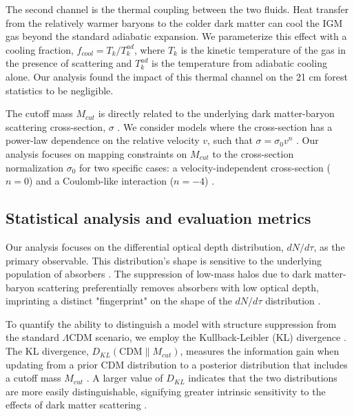 \documentclass[]{article}
\begin{document}
The second channel is the thermal coupling between the two fluids. Heat transfer from the relatively warmer baryons to the colder dark matter can cool the IGM gas beyond the standard adiabatic expansion. \citep{Mu_oz_2017,short2022darkmatterbaryonscatteringeffects} We parameterize this effect with a cooling fraction, $f_{cool} = T_k / T_k^{ad}$, where $T_k$ is the kinetic temperature of the gas in the presence of scattering and $T_k^{ad}$ is the temperature from adiabatic cooling alone. Our analysis found the impact of this thermal channel on the 21 cm forest statistics to be negligible.

The cutoff mass $M_{cut}$ is directly related to the underlying dark matter-baryon scattering cross-section, $\sigma$ . We consider models where the cross-section has a power-law dependence on the relative velocity $v$, such that $\sigma = \sigma_0 v^n$ \citep{Mahdawi_2018,Rahimieh_2025}. Our analysis focuses on mapping constraints on $M_{cut}$ to the cross-section normalization $\sigma_0$ for two specific cases: a velocity-independent cross-section ($n=0$) and a Coulomb-like interaction ($n=-4$) \citep{Mahdawi_2018,Rahimieh_2025}.

\subsection{Statistical analysis and evaluation metrics}

Our analysis focuses on the differential optical depth distribution, $dN/d\tau$, as the primary observable. This distribution's shape is sensitive to the underlying population of absorbers \citep{filipp2026lsststronglensingsystems}. The suppression of low-mass halos due to dark matter-baryon scattering preferentially removes absorbers with low optical depth, imprinting a distinct "fingerprint" on the shape of the $dN/d\tau$ distribution .

To quantify the ability to distinguish a model with structure suppression from the standard $\Lambda$CDM scenario, we employ the Kullback-Leibler (KL) divergence \citep{Hee_2016,herrera2026informationtheoreticastrophysicaluncertaintieseffective}. The KL divergence, $D_{KL}(\text{CDM} \parallel M_{cut})$, measures the information gain when updating from a prior CDM distribution to a posterior distribution that includes a cutoff mass $M_{cut}$ \citep{Hee_2016,herrera2026informationtheoreticastrophysicaluncertaintieseffective}. A larger value of $D_{KL}$ indicates that the two distributions are more easily distinguishable, signifying greater intrinsic sensitivity to the effects of dark matter scattering \citep{herrera2026informationtheoreticastrophysicaluncertaintieseffective}.
\end{document}
